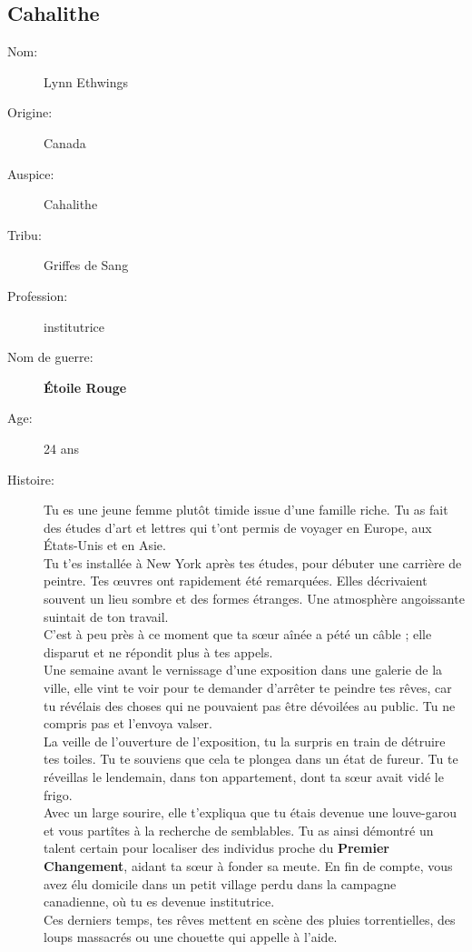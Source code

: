 \documentclass[oneside,12pt]{book}
\newcommand{\Lynn}{\textbf{Étoile Rouge} }
\begin{document}
\begin{flushleft}
\section{Cahalithe}
\begin{description}
\item[Nom:]{Lynn Ethwings}
\item[Origine:]{Canada}
\item[Auspice:]{Cahalithe}
\item[Tribu:]{Griffes de Sang}
\item[Profession:]{institutrice}
\item[Nom de guerre:]{\Lynn}
\item[Age:]{24 ans}
\item[Histoire:]{ 
Tu es une jeune femme plutôt timide issue d'une famille riche. Tu as fait des études d'art et lettres qui t’ont permis de voyager en Europe, aux États-Unis et en Asie. \\
Tu t’es installée à New York après tes études, pour débuter une carrière de peintre. Tes œuvres ont rapidement été remarquées. Elles décrivaient souvent un lieu sombre et des formes étranges. Une atmosphère angoissante suintait de ton travail. \\ 
C’est à peu près à ce moment que ta sœur aînée a pété un câble ; elle disparut et ne répondit plus à tes appels.\\  Une semaine avant le vernissage d’une exposition dans une galerie de la ville, elle vint te voir pour te demander d’arrêter te peindre tes rêves, car tu révélais des choses qui ne pouvaient pas être dévoilées au public. Tu ne compris pas et l’envoya valser.\\
La veille de l'ouverture de l'exposition, tu la surpris en train de détruire tes toiles. Tu te souviens que cela te plongea dans un état de fureur.  Tu te réveillas le lendemain, dans ton appartement, dont ta sœur avait vidé le frigo. \\
Avec un large sourire, elle t'expliqua que tu étais devenue une louve-garou et vous partîtes à la recherche de semblables. Tu as ainsi démontré un talent certain pour localiser des individus proche du \textbf{Premier Changement}, aidant ta sœur à fonder sa meute. En fin de compte, vous avez élu domicile dans un petit village perdu dans la campagne canadienne, où tu es devenue institutrice.\\
Ces derniers temps, tes rêves mettent en scène des pluies torrentielles, des loups massacrés ou une chouette qui appelle à l'aide.\\
}
\end{description}
\end{flushleft}
\end{document}
